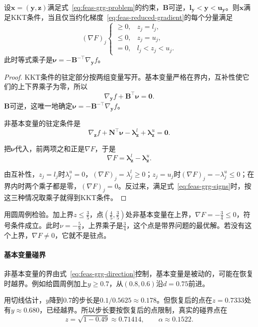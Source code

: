 \begin{theorem}[约化梯度与KKT条件]
\label{thm:feas-grg-kkt}
设$\bm{x}=(\bm{y},\bm{z})$满足式~\eqref{eq:feas-grg-problem}的约束，$\bm{B}$可逆，$\bm{l}_{\bm{y}}<\bm{y}<\bm{u}_{\bm{y}}$。则$\bm{x}$满足KKT条件，当且仅当约化梯度~\eqref{eq:feas-reduced-gradient}的每个分量满足
\begin{equation}
 (\nabla F)_j\begin{cases}
 \geq0,& z_j=l_j,\\
 \leq0,& z_j=u_j,\\
 =0,& l_j<z_j<u_j.
 \end{cases}
 \label{eq:feas-grg-signs}
\end{equation}
此时等式乘子是$\bm{\nu}=-\bm{B}^{-\top}\nabla_{\bm{y}}f$。
\end{theorem}

\begin{proof}
KKT条件的驻定部分按两组变量写开。基本变量严格在界内，互补性使它们的上下界乘子为零，所以
\[
 \nabla_{\bm{y}}f+\bm{B}^\top\bm{\nu}=\bm{0}.
\]
$\bm{B}$可逆，这唯一地确定$\bm{\nu}=-\bm{B}^{-\top}\nabla_{\bm{y}}f$。

非基本变量的驻定条件是
\[
 \nabla_{\bm{z}}f+\bm{N}^\top\bm{\nu}-\bm{\lambda}^{l}_{\bm{z}}+\bm{\lambda}^{u}_{\bm{z}}=\bm{0}.
\]

把$\bm{\nu}$代入，前两项之和正是$\nabla F$，于是
\[
 \nabla F=\bm{\lambda}^{l}_{\bm{z}}-\bm{\lambda}^{u}_{\bm{z}}.
\]

由互补性，$z_j=l_j$时$\lambda^u_j=0$，$(\nabla F)_j=\lambda^l_j\geq0$；$z_j=u_j$时$(\nabla F)_j=-\lambda^u_j\leq0$；在界内时两个乘子都是零，$(\nabla F)_j=0$。反过来，满足式~\eqref{eq:feas-grg-signs}时，按这三种情况取乘子就得到KKT条件。
\end{proof}

用圆周例检验。加上界$z\leq\tfrac35$，点$(\tfrac45,\tfrac35)$处非基本变量在上界，$\nabla F=-\tfrac34\leq0$，符号条件成立。此时$\nu=-\tfrac58$，上界乘子是$\tfrac34$，这个点是带界问题的最优解。若没有这个上界，$\nabla F\neq0$，它就不是驻点。

\paragraph{基本变量碰界}
非基本变量的界由式~\eqref{eq:feas-grg-direction}控制，基本变量是被动的，可能在恢复时越界。例如给圆周例加上$y\geq0.7$，从$(0.8,0.6)$沿$d=0.75$前进。

用切线估计，$y$降到$0.7$的步长是$0.1/0.5625\approx0.178$。但恢复后的点在$z=0.7333$处有$y\approx0.680$，已经越界。所以步长要按恢复后的点限制，真实的碰界点在
\[
 z=\sqrt{1-0.49}\approx0.71414,\qquad\alpha\approx0.1522.
\]

